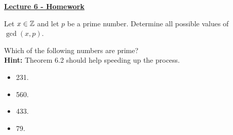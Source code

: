 \documentclass[12pt]{article} %
\begin{document}
	\renewcommand*{\coursecode}{MATH 235} %
	\renewcommand*{\assgnnumber}{Assignment 1} %
	\renewcommand*{\submdate}{September 14, 2021} %
	\renewcommand*{\studentfname}{Abdullah} %
	\renewcommand*{\studentlname}{Zubair} %
    \renewcommand*{\proofname}{Proof:}

	\renewcommand\qedsymbol{$\blacksquare$}
	\setfigpath
	\fancyhfoffset[L,O]{0pt} %




\begin{center}
	\textbf{\underline{\Huge{Lecture 6 - Homework}}}
\end{center}
\begin{qstn}
  Let $x \in \mathbb Z$ and let $p$ be a prime number. Determine all possible values of $\gcd(x,p)$.
\end{qstn}

\begin{qstn}
  Which of the following numbers are prime?\\
  \textbf{Hint: }Theorem 6.2 should help speeding up the process.
  \begin{itemize}
    \item 231.
    \item 560.
    \item 433.
    \item 79.
  \end{itemize}
\end{qstn}
\end{document}
